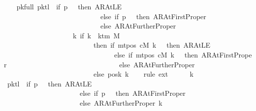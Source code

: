 \begin{isabellebody}
\isanewline
\ \ \isamarkupfalse%
\ pk{\isacharunderscore}{\kern0pt}full{\isacharcolon}{\kern0pt}\ {\isachardoublequoteopen}{\isacharquery}{\kern0pt}pk{\isacharparenleft}{\kern0pt}{\isacharquery}{\kern0pt}tl\ {\isacharcolon}{\kern0pt}{\isacharequal}{\kern0pt}\ if\ {\isacharquery}{\kern0pt}p\ {\isacharequal}{\kern0pt}\ {}\ then\ AR{\isacharunderscore}{\kern0pt}AtLE\isanewline
\ \ \ \ \ \ \ \ \ \ \ \ \ \ \ \ \ \ \ \ \ \ \ \ \ \ \ \ else\ if\ {\isacharquery}{\kern0pt}p\ {\isacharequal}{\kern0pt}\ {}\ then\ AR{\isacharunderscore}{\kern0pt}AtFirstProper\isanewline
\ \ \ \ \ \ \ \ \ \ \ \ \ \ \ \ \ \ \ \ \ \ \ \ \ \ \ \ else\ AR{\isacharunderscore}{\kern0pt}AtFurtherProper{\isacharparenright}{\kern0pt}\isanewline
\ \ \ \ \ \ \ \ \ \ \ \ \ \ \ \ \ \ \ {\isacharequal}{\kern0pt}\ {\isacharparenleft}{\kern0pt}{\isasymlambda}k{\isachardot}{\kern0pt}\ if\ k\ {\isacharless}{\kern0pt}\ k{\isacharunderscore}{\kern0pt}tm\ M\isanewline
\ \ \ \ \ \ \ \ \ \ \ \ \ \ \ \ \ \ \ \ \ \ \ \ \ \ then\ {\isacharparenleft}{\kern0pt}if\ mt{\isacharunderscore}{\kern0pt}pos\ cM\ k\ {\isacharequal}{\kern0pt}\ {}\ then\ AR{\isacharunderscore}{\kern0pt}AtLE\isanewline
\ \ \ \ \ \ \ \ \ \ \ \ \ \ \ \ \ \ \ \ \ \ \ \ \ \ \ \ \ \ \ \ else\ if\ mt{\isacharunderscore}{\kern0pt}pos\ cM\ k\ {\isacharequal}{\kern0pt}\ {}\ then\ AR{\isacharunderscore}{\kern0pt}AtFirstProper\isanewline
\ \ \ \ \ \ \ \ \ \ \ \ \ \ \ \ \ \ \ \ \ \ \ \ \ \ \ \ \ \ \ \ else\ AR{\isacharunderscore}{\kern0pt}AtFurtherProper{\isacharparenright}{\kern0pt}\isanewline
\ \ \ \ \ \ \ \ \ \ \ \ \ \ \ \ \ \ \ \ \ \ \ \ \ \ else\ posk{}\ k{\isacharparenright}{\kern0pt}{\isachardoublequoteclose}\isanewline
\ \ \isamarkupfalse%
\ {\isacharparenleft}{\kern0pt}rule\ ext{\isacharparenright}{\kern0pt}\isanewline
\ \ \ \ \isamarkupfalse%
\ k\isanewline
\ \ \ \ \isamarkupfalse%
\ {\isachardoublequoteopen}{\isacharparenleft}{\kern0pt}{\isacharquery}{\kern0pt}pk{\isacharparenleft}{\kern0pt}{\isacharquery}{\kern0pt}tl\ {\isacharcolon}{\kern0pt}{\isacharequal}{\kern0pt}\ if\ {\isacharquery}{\kern0pt}p\ {\isacharequal}{\kern0pt}\ {}\ then\ AR{\isacharunderscore}{\kern0pt}AtLE\isanewline
\ \ \ \ \ \ \ \ \ \ \ \ \ \ \ \ \ \ \ \ \ \ else\ if\ {\isacharquery}{\kern0pt}p\ {\isacharequal}{\kern0pt}\ {}\ then\ AR{\isacharunderscore}{\kern0pt}AtFirstProper\isanewline
\ \ \ \ \ \ \ \ \ \ \ \ \ \ \ \ \ \ \ \ \ \ else\ AR{\isacharunderscore}{\kern0pt}AtFurtherProper{\isacharparenright}{\kern0pt}{\isacharparenright}{\kern0pt}\ k\isanewline

\end{isabellebody}
